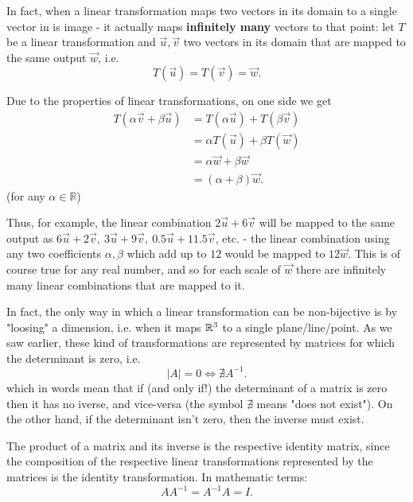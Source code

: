 In fact, when a linear transformation maps two vectors in its domain to a single vector in is image - it actually maps \textbf{infinitely many} vectors to that point: let $T$ be a linear transformation and $\vec{u},\vec{v}$ two vectors in its domain that are mapped to the same output $\vec{w}$, i.e.
\[
	T \left( \vec{u} \right) = T \left( \vec{v} \right) = \vec{w}.
\]

Due to the properties of linear transformations, on one side we get
\begin{align}
	T \left( \alpha\vec{v}+\beta\vec{u} \right) &= T \left( \alpha\vec{u} \right) + T \left( \beta\vec{v} \right)\\ 
												&= \alpha T \left( \vec{u} \right)  + \beta T\left(\vec{w}\right)\\
												&= \alpha\vec{w} + \beta\vec{w}\\
												&= (\alpha+\beta)\vec{w}.
\end{align}
(for any $\alpha\in\mathbb{R}$)

Thus, for example, the linear combination $2\vec{u}+6\vec{v}$ will be mapped to the same output as $6\vec{u}+2\vec{v},\ 3\vec{u}+9\vec{v},\ 0.5\vec{u}+11.5\vec{v}$, etc. - the linear combination using any two coefficients $\alpha,\beta$ which add up to $12$ would be mapped to $12\vec{w}$. This is of course true for any real number, and so for each scale of $\vec{w}$ there are infinitely many linear combinations that are mapped to it.

In fact, the only way in which a linear transformation can be non-bijective is by "loosing" a dimension, i.e. when it maps $\mathbb{R}^{3}$ to a single plane/line/point. As we saw earlier, these kind of transformations are represented by matrices for which the determinant is zero, i.e.
\begin{equation}
	|A|=0 \Leftrightarrow \nexists A^{-1}.
	\label{eq:determinant_zero_no_inverse}
\end{equation}
which in words mean that if (and only if!) the determinant of a matrix is zero then it has no iverse, and vice-versa (the symbol $\nexists$ means "does not exist"). On the other hand, if the determinant isn't zero, then the inverse must exist.

The product of a matrix and its inverse is the respective identity matrix, since the composition of the respective linear transformations represented by the matrices is the identity transformation. In mathematic terms:
\begin{equation}
	AA^{-1} = A^{-1}A = I.
	\label{eq:matrix_inverse_identity}
\end{equation}

